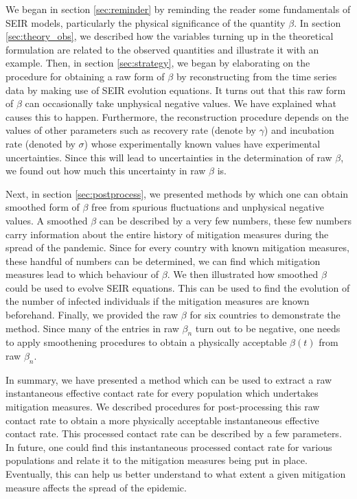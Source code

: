 \documentclass[aps,prd,10pt,twocolumn,nofootinbib]{revtex4-2}
\begin{document}
We began in section \textsection \ref{sec:reminder} by reminding the reader some fundamentals of SEIR models, particularly the physical significance of the quantity $\beta$.
In section \textsection \ref{sec:theory_obs}, we described how the variables turning up in the theoretical formulation are related to the observed quantities and illustrate it with an example. 
Then, in section \textsection \ref{sec:strategy}, we began by elaborating on the procedure for obtaining a raw form of $\beta$ by reconstructing from the time series data by making use of SEIR evolution equations. It turns out that this raw form of $\beta$ can occasionally take unphysical negative values. We have explained what causes this to happen. Furthermore, the reconstruction procedure depends on the values of other parameters such as recovery rate (denote by $\gamma$) and incubation rate (denoted by $\sigma$) whose experimentally known values have experimental uncertainties. Since this will lead to uncertainties in the determination of raw $\beta$, we found out how much this uncertainty in raw $\beta$ is.

Next, in section \textsection \ref{sec:postprocess}, we presented methods by which one can obtain smoothed form of $\beta$ free from spurious fluctuations and unphysical negative values. A smoothed $\beta$ can be described by a very few numbers, these few numbers carry information about the entire history of mitigation measures during the spread of the pandemic. Since for every country with known mitigation measures, these handful of numbers can be determined, we can find which mitigation measures lead to which behaviour of $\beta$.
We then illustrated how smoothed $\beta$ could be used to evolve SEIR equations. This can be used to find the evolution of the number of infected individuals if the mitigation measures are known beforehand.
Finally, we provided the raw $\beta$ for six countries to demonstrate the method.
Since many of the entries in raw $\beta_n$ turn out to be negative, one needs to apply smoothening procedures to obtain a physically acceptable $\beta(t)$ from raw $\beta_n$.

In summary, we have presented a method which can be used to extract a raw instantaneous effective contact rate for every population which undertakes mitigation measures. We described procedures for post-processing this raw contact rate to obtain a more physically acceptable instantaneous effective contact rate. This processed contact rate can be described by a few parameters. In future, one could find this instantaneous processed contact rate for various populations and relate it to the mitigation measures being put in place. Eventually, this can help us better understand to what extent a given mitigation measure affects the spread of the epidemic.
\end{document}
